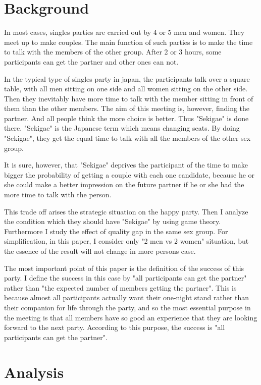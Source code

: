 \documentclass{article}
\begin{document}
\section{Background}
\par
In most cases, singles parties are carried out by 4 or 5 men and women. They meet up to make couples. The main function of such parties is to make the time to talk with the members of the other group. After 2 or 3 hours, some participants can get the partner and other ones can not. 
\par
In the typical type of singles party in japan, the participants talk over a square table, with all men sitting on one side and all women sitting on the other side. Then they inevitably have more time to talk with the member sitting in front of them than the other members. The aim of this meeting is, however, finding the partner. And all people think the more choice is better. Thus "Sekigae" is done there. "Sekigae" is the Japanese term which means changing seats. By doing "Sekigae", they get the equal time to talk with all the members of the other sex group.
\par
It is sure, however, that "Sekigae" deprives the participant of the time to make bigger the probability of getting a couple with each one candidate, because he or she could make a better impression on the future partner if he or she had the more time to talk with the person.
\par
This trade off arises the strategic situation on the happy party. Then I analyze the condition which they should have "Sekigae" by using game theory. Furthermore I study the effect of quality gap in the same sex group. For simplification, in this paper, I consider only "2 men vs 2 women" situation, but the essence of the result will not change in more persons case. 
\par
The most important point of this paper is the definition of the success of this party. I define the success in this case by "all participants can get the partner" rather than "the expected number of members getting the partner". This is because almost all participants actually want their one-night stand rather than their companion for life through the party, and so the most essential purpose in the meeting is that all members have so good an experience that they are looking forward to the next party. According to this purpose, the success is "all participants can get the partner".
\section{Analysis}
\end{document}
